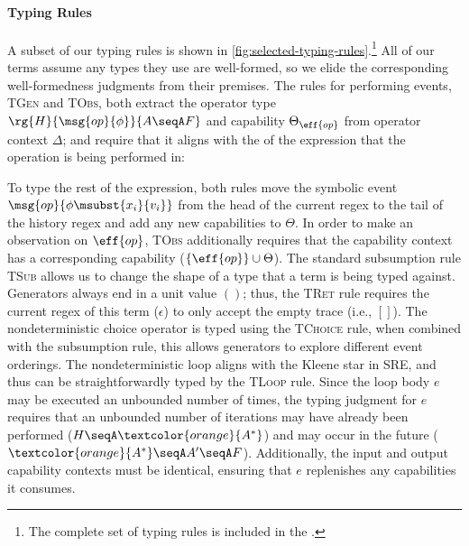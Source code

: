 \paragraph{Typing Rules} A subset of our typing rules is shown in
\autoref{fig:selected-typing-rules}.\footnote{The complete set of
  typing rules is included in the \techreport{}.} All of our terms
assume any types they use are well-formed, so we elide the
corresponding well-formedness judgments from their premises.
The rules for performing events, \textsc{TGen} and \textsc{TObs}, both extract the operator type $\rg{H}{\msg{op}{\phi}}{A \seqA F}$ and capability $\Theta_{\eff{op}}$ from operator context $\Delta$; and require that it aligns with the \PAT{} of the expression that the operation is being performed in:%
\vspace{-.4cm} \par{}\noindent %
To type the rest of the expression, both rules move the symbolic event
$\msg{op}{\phi\msubst{x_i}{v_i}}$ from the head of the current
regex to the tail of the history regex and add any new
capabilities to $\Theta$. In order to make an observation on
$\eff{op}$, \textsc{TObs} additionally requires that the capability
context has a corresponding capability ($\{\eff{op}\} \cup \Theta$). The
standard subsumption rule \textsc{TSub} allows us to change the shape
of a type that a term is being typed against. Generators always end in a
unit value $()$; thus, the \textsc{TRet} rule requires the current
regex of this term ($\epsilon$) to only accept the empty trace (i.e.,
$[]$). The nondeterministic choice operator is typed using the
\textsc{TChoice} rule, when combined with the subsumption rule, this
allows generators to explore different event orderings.
The nondeterministic loop aligns with the Kleene star in SRE, and thus can be straightforwardly typed by the \textsc{TLoop} rule.
Since the loop body $e$ may be executed an unbounded number of times, the typing judgment for $e$ requires that an unbounded number of iterations may have already been performed ($H \seqA \textcolor{orange}{A^*}$) and may occur in the future ($\textcolor{orange}{A^*} \seqA A' \seqA F$). Additionally, the input and output capability contexts must be identical, ensuring that $e$ replenishes any capabilities it consumes.

